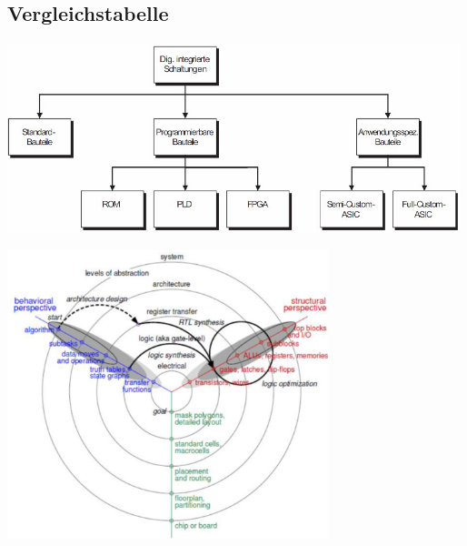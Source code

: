 %
%

%
%

\subsection{Vergleichstabelle}
\begin{minipage}{0.41\textwidth}
\includegraphics[width=0.99\textwidth]{pics/devicecomparetables}
\end{minipage}
\hfill
\begin{minipage}{0.58\textwidth}
\includegraphics[width=0.7\textwidth]{pics/abstraktion.png}
\end{minipage}

